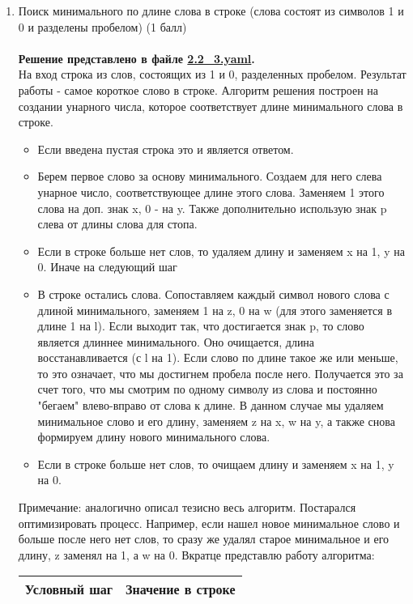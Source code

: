 \documentclass{article}
\begin{document}
\begin{enumerate}
    \item Поиск минимального по длине слова в строке (слова состоят из символов 1 и 0 и разделены пробелом) (1 балл) \\ \\ 
    \textbf{Решение представлено в файле \href{https://github.com/NRU-MPEI-IMAI/tm-and-qc-s3tout/blob/main/TMV3/2.1_2.yaml}{2.2\_3.yaml}.} \\
    На вход строка из слов, состоящих из 1 и 0, разделенных пробелом. Результат работы - самое короткое слово в строке. 
    Алгоритм решения построен на создании унарного числа, которое соответствует длине минимального слова в строке. 
    \begin{itemize}
        \item Если введена пустая строка это и является ответом. 
        \item Берем первое слово за основу минимального. Создаем для него слева унарное число, соответствующее длине этого слова. Заменяем 1 этого слова на доп. знак x, 0 - на y. Также дополнительно использую знак p слева от длины слова для стопа. 
        \item Если в строке больше нет слов, то удаляем длину и заменяем x на 1, y на 0. Иначе на следующий шаг
        \item В строке остались слова. Сопоставляем каждый символ нового слова с длиной минимального, заменяем 1 на z, 0 на w (для этого заменяется в длине 1 на l). Если выходит так, что достигается знак p, то слово является длиннее минимального. Оно очищается, длина восстанавливается (с l на 1). Если слово по длине такое же или меньше, то это означает, что мы достигнем пробела после него. Получается это за счет того, что мы смотрим по одному символу из слова и постоянно "бегаем" влево-вправо от слова к длине. В данном случае мы удаляем минимальное слово и его длину, заменяем z на x, w на y, а также снова формируем длину нового минимального слова. 
        \item Если в строке больше нет слов, то очищаем длину и заменяем x на 1, y на 0. 
    \end{itemize}
    Примечание: аналогично описал тезисно весь алгоритм. Постарался оптимизировать процесс. Например, если нашел новое минимальное слово и больше после него нет слов, то сразу же удалял старое минимальное и его длину, z заменял на 1, а w на 0. 
    Вкратце представлю работу алгоритма: 
    \begin{center}
    \begin{tabular}{c|c}
        Условный шаг    & Значение в строке     \\ \hline

\end{tabular}
\end{center}
\end{enumerate}
\end{document}
